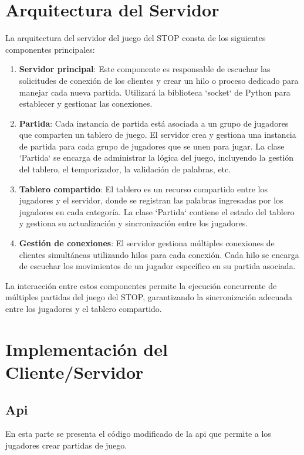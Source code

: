 \documentclass{article}
\begin{document}
\section{Arquitectura del Servidor}

La arquitectura del servidor del juego del STOP consta de los siguientes componentes principales:

\begin{enumerate}
    \item   \textbf{Servidor principal}: Este componente es responsable de escuchar las solicitudes de conexión de los clientes y crear un hilo o proceso dedicado para manejar 
    cada nueva partida. Utilizará la biblioteca `socket` de Python para establecer y gestionar las conexiones.
    
    \item \textbf{Partida}: Cada instancia de partida está asociada a un grupo de jugadores que comparten un tablero de juego. El servidor crea y gestiona una instancia de 
    partida para cada grupo de jugadores que se unen para jugar. La clase `Partida` se encarga de administrar la lógica del juego, incluyendo la gestión del tablero, el temporizador, 
    la validación de palabras, etc.

    \item \textbf{Tablero compartido}: El tablero es un recurso compartido entre los jugadores y el servidor, donde se registran las palabras ingresadas por los jugadores en cada 
    categoría. La clase `Partida` contiene el estado del tablero y gestiona su actualización y sincronización entre los jugadores.

    \item \textbf{Gestión de conexiones}: El servidor gestiona múltiples conexiones de clientes simultáneas utilizando hilos para cada conexión. Cada hilo se encarga de escuchar 
    los movimientos de un jugador específico en su partida asociada.
\end{enumerate}

La interacción entre estos componentes permite la ejecución concurrente de múltiples partidas del juego del STOP, garantizando la sincronización adecuada entre los jugadores y el 
tablero compartido.


\section{Implementación del Cliente/Servidor}

\subsection{Api}
En esta parte se presenta el código modificado de la api que permite a los jugadores crear partidas de juego.
\end{document}
